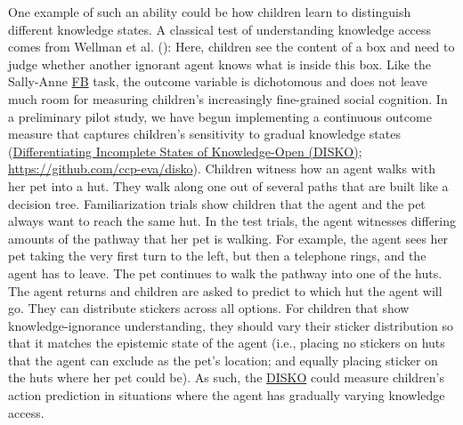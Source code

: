 \documentclass[
]{scrbook}
\begin{document}
One example of such an ability could be how children learn to distinguish different knowledge states. A classical test of understanding knowledge access comes from Wellman et al. (): Here, children see the content of a box and need to judge whether another ignorant agent knows what is inside this box. Like the Sally-Anne \hyperref[acronyms_FB]{FB} task, the outcome variable is dichotomous and does not leave much room for measuring children's increasingly fine-grained social cognition. In a preliminary pilot study, we have begun implementing a continuous outcome measure that captures children's sensitivity to gradual knowledge states (\hyperref[acronyms_DISKO]{Differentiating Incomplete States of Knowledge-Open (DISKO)}; \mbox{\url{https://github.com/ccp-eva/disko}}). Children witness how an agent walks with her pet into a hut. They walk along one out of several paths that are built like a decision tree. Familiarization trials show children that the agent and the pet always want to reach the same hut. In the test trials, the agent witnesses differing amounts of the pathway that her pet is walking. For example, the agent sees her pet taking the very first turn to the left, but then a telephone rings, and the agent has to leave. The pet continues to walk the pathway into one of the huts. The agent returns and children are asked to predict to which hut the agent will go. They can distribute stickers across all options. For children that show knowledge-ignorance understanding, they should vary their sticker distribution so that it matches the epistemic state of the agent (i.e., placing no stickers on huts that the agent can exclude as the pet's location; and equally placing sticker on the huts where her pet could be). As such, the \hyperref[acronyms_DISKO]{DISKO} could measure children's action prediction in situations where the agent has gradually varying knowledge access.
\end{document}
